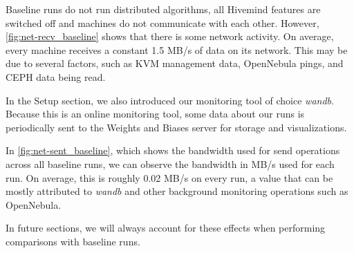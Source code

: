 Baseline runs do not run distributed algorithms, all Hivemind features are switched off and machines do not communicate with each other.
However, \autoref{fig:net-recv_baseline} shows that there is some network activity.
On average, every machine receives a constant 1.5 MB/s of data on its network.
This may be due to several factors, such as KVM management data, OpenNebula pings, and CEPH data being read.

In the Setup section, we also introduced our monitoring tool of choice \textit{wandb}.
Because this is an online monitoring tool, some data about our runs is periodically sent to the Weights and Biases server for storage and visualizations.

In \autoref{fig:net-sent_baseline}, which shows the bandwidth used for send operations across all baseline runs, we can observe the bandwidth in MB/s used for each run.
On average, this is roughly 0.02 MB/s on every run, a value that can be mostly attributed to \textit{wandb} and other background monitoring operations such as OpenNebula.

In future sections, we will always account for these effects when performing comparisons with baseline runs.

